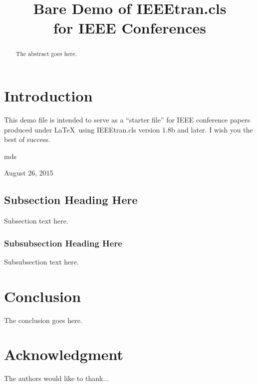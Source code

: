 \documentclass[10pt,conference]{IEEEtran}
\begin{document}
\title{Bare Demo of IEEEtran.cls\\ for IEEE Conferences}


\author{
\and
{}
\and
{}
}


\maketitle


\begin{abstract}
The abstract goes here.
\end{abstract}


\IEEEpeerreviewmaketitle


\section{Introduction}
This demo file is intended to serve as a ``starter file''
for IEEE conference papers produced under \LaTeX\ using
IEEEtran.cls version 1.8b and later.
I wish you the best of success.

\hfill mds
 
\hfill August 26, 2015

\subsection{Subsection Heading Here}
Subsection text here.


\subsubsection{Subsubsection Heading Here}
Subsubsection text here.


\section{Conclusion}
The conclusion goes here.


\section*{Acknowledgment}
The authors would like to thank...



\end{document}
